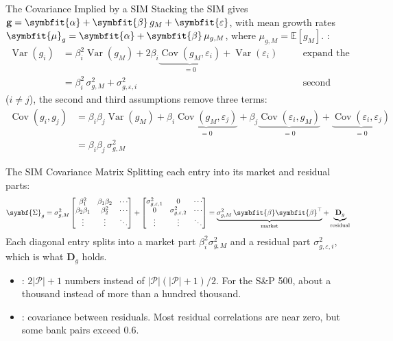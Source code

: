 \documentclass[aspectratio=169,11pt]{beamer}
\newcommand{\E}{\mathbb{E}}
\newcommand{\Var}{\operatorname{Var}}
\newcommand{\Cov}{\operatorname{Cov}}
\newcommand{\bg}{\mathbf{g}}
\newcommand{\bal}{\symbfit{\alpha}}
\newcommand{\bbe}{\symbfit{\beta}}
\newcommand{\beps}{\symbfit{\varepsilon}}
\newcommand{\bmu}{\symbfit{\mu}_{g}}
\newcommand{\Dg}{\mathbf{D}_{g}}
\newcommand{\Sig}{\symbf{\Sigma}_{g}}
\newcommand{\np}{|\mathcal{P}|}
\begin{document}
\begin{frame}{The Covariance Implied by a SIM}
  Stacking the SIM gives $\bg=\bal+\bbe\,g_M+\beps$, with mean growth rates
  $\bmu=\bal+\bbe\,\mu_{g,M}$, where $\mu_{g,M}=\E[g_M]$.
  :
  \[
    \begin{aligned}
      \Var(g_i)&=\beta_i^2\Var(g_M)+2\beta_i\underbrace{\Cov(g_M,\varepsilon_i)}_{=0}+\Var(\varepsilon_i)
        &&\quad\text{expand the SIM}\\
      &=\beta_i^2\,\sigma^2_{g,M}+\sigma^2_{g,\varepsilon,i}
        &&\quad\text{second assumption}
    \end{aligned}
  \]
   ($i\neq j$), the second and third assumptions remove three terms:
  \[
    \begin{aligned}
      \Cov(g_i,g_j)&=\beta_i\beta_j\Var(g_M)+\beta_i\underbrace{\Cov(g_M,\varepsilon_j)}_{=0}
        +\beta_j\underbrace{\Cov(\varepsilon_i,g_M)}_{=0}+\underbrace{\Cov(\varepsilon_i,\varepsilon_j)}_{=0}\\
      &=\beta_i\beta_j\,\sigma^2_{g,M}
    \end{aligned}
  \]
\end{frame}

\begin{frame}{The SIM Covariance Matrix}
  Splitting each entry into its market and residual parts:
  \[
    \Sig=\sigma^2_{g,M}\begin{bmatrix}\beta_1^2&\beta_1\beta_2&\cdots\\ \beta_2\beta_1&\beta_2^2&\cdots\\ \vdots&\vdots&\ddots\end{bmatrix}
    +\begin{bmatrix}\sigma^2_{g,\varepsilon,1}&0&\cdots\\ 0&\sigma^2_{g,\varepsilon,2}&\cdots\\ \vdots&\vdots&\ddots\end{bmatrix}
    =\underbrace{\sigma^2_{g,M}\,\bbe\bbe^{\top}}_{\text{market}}+\underbrace{\Dg}_{\text{residual}}
  \]
  Each diagonal entry splits into a market part $\beta_i^2\sigma^2_{g,M}$ and a
  residual part $\sigma^2_{g,\varepsilon,i}$, which is what $\Dg$ holds.
  \begin{itemize}\setlength{\itemsep}{0.35em}
    \item {}: $2\np+1$ numbers instead of
      $\np(\np+1)/2$. For the S\&P 500, about a thousand instead of more than a
      hundred thousand.
    \item {}: covariance between residuals. Most
      residual correlations are near zero, but some bank pairs exceed 0.6.
  \end{itemize}
\end{frame}
\end{document}

